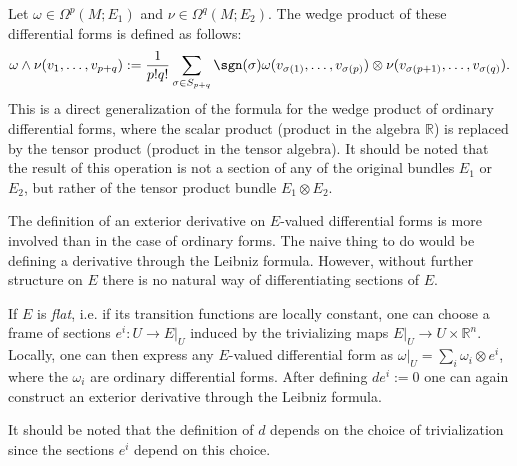     \begin{construct}\label{bundle:vector_valued_wedge}
        Let $\omega\in\Omega^p(M;E_1)$ and $\nu\in\Omega^q(M;E_2)$. The wedge product of these differential forms is defined as follows:
        \begin{gather}
            \omega\wedge\nu(v_1,\dots,v_{p+q}) := \frac{1}{p!q!}\sum_{\sigma\in S_{p+q}}\sgn(\sigma)\omega(v_{\sigma(1)},\ldots, v_{\sigma(p)})\otimes\nu(v_{\sigma(p+1)},\ldots,v_{\sigma(q)}).
        \end{gather}
        This is a direct generalization of the formula for the wedge product of ordinary differential forms, where the scalar product (product in the algebra $\mathbb{R}$) is replaced by the tensor product (product in the tensor algebra). It should be noted that the result of this operation is not a section of any of the original bundles $E_1$ or $E_2$, but rather of the tensor product bundle $E_1\otimes E_2$.
    \end{construct}

    \begin{construct}\label{bundle:twisted_differential}
        The definition of an exterior derivative on $E$-valued differential forms is more involved than in the case of ordinary forms. The naive thing to do would be defining a derivative through the Leibniz formula. However, without further structure on $E$ there is no natural way of differentiating sections of $E$.

        If $E$ is \textit{flat}, i.e. if its transition functions are locally constant, one can choose a frame of sections $e^i:U\rightarrow E|_U$ induced by the trivializing maps $E|_U\rightarrow U\times\mathbb{R}^n$. Locally, one can then express any $E$-valued differential form as $\omega|_U=\sum_i\omega_i\otimes e^i$, where the $\omega_i$ are ordinary differential forms. After defining $de^i:=0$ one can again construct an exterior derivative through the Leibniz formula.
    \end{construct}
    \begin{remark}
        It should be noted that the definition of $d$ depends on the choice of trivialization since the sections $e^i$ depend on this choice.
    \end{remark}


